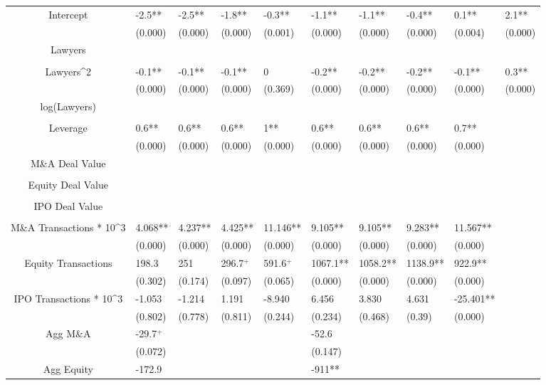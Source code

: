 \documentclass{article}
\begin{document}
\begin{table}[H]
\begin{tabular}{|clllllllll|}
Intercept & -2.5** & -2.5** & -1.8** & -0.3** & -1.1** & -1.1** & -0.4** & 0.1** & 2.1** \\
   & (0.000) & (0.000) & (0.000) & (0.001) & (0.000) & (0.000) & (0.000) & (0.004) & (0.000) \\
  Lawyers &  &  &  &  &  &  &  &  &  \\
   &  &  &  &  &  &  &  &  &  \\
  Lawyers^2 & -0.1** & -0.1** & -0.1** & 0 & -0.2** & -0.2** & -0.2** & -0.1** & 0.3** \\
   & (0.000) & (0.000) & (0.000) & (0.369) & (0.000) & (0.000) & (0.000) & (0.000) & (0.000) \\
  log(Lawyers) &  &  &  &  &  &  &  &  &  \\
   &  &  &  &  &  &  &  &  &  \\
  Leverage & 0.6** & 0.6** & 0.6** & 1** & 0.6** & 0.6** & 0.6** & 0.7** &  \\
   & (0.000) & (0.000) & (0.000) & (0.000) & (0.000) & (0.000) & (0.000) & (0.000) &  \\
  M\&A Deal Value &  &  &  &  &  &  &  &  &  \\
   &  &  &  &  &  &  &  &  &  \\
  Equity Deal Value &  &  &  &  &  &  &  &  &  \\
   &  &  &  &  &  &  &  &  &  \\
  IPO Deal Value &  &  &  &  &  &  &  &  &  \\
   &  &  &  &  &  &  &  &  &  \\
  M\&A Transactions * 10^3 & 4.068** & 4.237** & 4.425** & 11.146** & 9.105** & 9.105** & 9.283** & 11.567** &  \\
   & (0.000) & (0.000) & (0.000) & (0.000) & (0.000) & (0.000) & (0.000) & (0.000) &  \\
  Equity Transactions & 198.3 & 251 & 296.7$^{+}$ & 591.6$^{+}$ & 1067.1** & 1058.2** & 1138.9** & 922.9** &  \\
   & (0.302) & (0.174) & (0.097) & (0.065) & (0.000) & (0.000) & (0.000) & (0.000) &  \\
  IPO Transactions * 10^3 & -1.053 & -1.214 & 1.191 & -8.940 & 6.456 & 3.830 & 4.631 & -25.401** &  \\
   & (0.802) & (0.778) & (0.811) & (0.244) & (0.234) & (0.468) & (0.39) & (0.000) &  \\
  Agg M\&A & -29.7$^{+}$ &  &  &  & -52.6 &  &  &  &  \\
   & (0.072) &  &  &  & (0.147) &  &  &  &  \\
  Agg Equity & -172.9 &  &  &  & -911** &  &  &  &  \\

\end{tabular}
\end{table}
\end{document}

